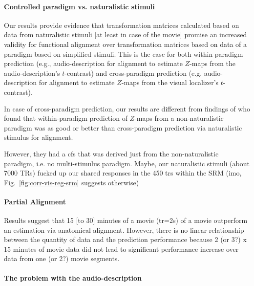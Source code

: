 

\paragraph{Controlled paradigm vs. naturalistic stimuli}
%
Our results provide evidence that transformation matrices calculated based on
data from naturalistic stimuli [at least in case of the movie] promise an
increased validity for functional alignment over transformation matrices based
on data of a paradigm based on simplified stimuli.
%
This is the case for both within-paradigm prediction (e.g., audio-description
for alignment to estimate $Z$-maps from the audio-description's $t$-contrast)
and cross-paradigm prediction (e.g. audio-description for alignment to estimate
$Z$-maps from the visual localizer's $t$-contrast).

%
In case of cross-paradigm prediction, our results are different from findings of
\citet{haxby2011common} who found that within-paradigm prediction of $Z$-maps
from a non-naturalistic paradigm was as good or better than cross-paradigm
prediction via naturalistic stimulus for alignment.

%
However, they had a \ac{cfs} that was derived just from the non-naturalistic
paradigm, i.e. no multi-stimulus paradigm.
%
Maybe, our naturalistic stimuli (about 7000 TRs) fucked up our shared responses
in the 450 \acp{tr} within the SRM (imo, Fig.~\ref{fig:corr-vis-reg-srm}
suggests otherwise)


\paragraph{Partial Alignment}


%
Results suggest that 15 [to 30] minutes of a movie (\ac{tr}=2s) of a movie
outperform an estimation via anatomical alignment.
%
However, there is no linear relationship between the quantity of data and the
prediction performance because 2 (or 3?) x 15 minutes of movie data did not lead
to significant performance increase over data from one (or 2?) movie segments.


\paragraph{The problem with the audio-description}

